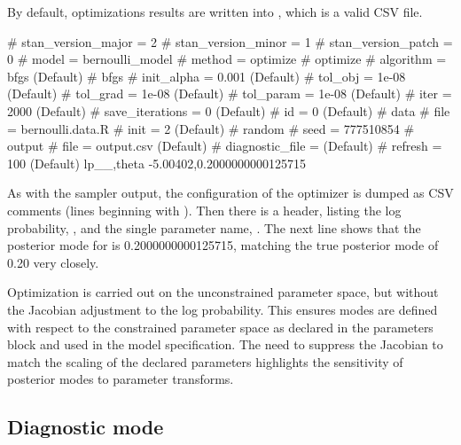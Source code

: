 \documentclass[article]{jss}
\begin{document}
By default, optimizations results are written into ,
which is a valid CSV file.
%
\begin{CodeChunk}
\begin{CodeOutput}
# stan_version_major = 2
# stan_version_minor = 1
# stan_version_patch = 0
# model = bernoulli_model
# method = optimize
#   optimize
#     algorithm = bfgs (Default)
#       bfgs
#         init_alpha = 0.001 (Default)
#         tol_obj = 1e-08 (Default)
#         tol_grad = 1e-08 (Default)
#         tol_param = 1e-08 (Default)
#     iter = 2000 (Default)
#     save_iterations = 0 (Default)
# id = 0 (Default)
# data
#   file = bernoulli.data.R
# init = 2 (Default)
# random
#   seed = 777510854
# output
#   file = output.csv (Default)
#   diagnostic_file =  (Default)
#   refresh = 100 (Default)
lp__,theta
-5.00402,0.2000000000125715
\end{CodeOutput}
\end{CodeChunk}
%
As with the sampler output, the configuration of the optimizer is
dumped as CSV comments (lines beginning with \code{\#}).  Then there
is a header, listing the log probability, , and the
single parameter name, .  The next line shows that the
posterior mode for  is 0.2000000000125715, matching the
true posterior mode of 0.20 very closely.

Optimization is carried out on the unconstrained parameter space, but
without the Jacobian adjustment to the log probability.  This ensures
modes are defined with respect to the constrained parameter space as
declared in the parameters block and used in the model specification.
The need to suppress the Jacobian to match the scaling of the declared
parameters highlights the sensitivity of posterior modes to parameter
transforms. 

\subsection{Diagnostic mode}
\end{document}
